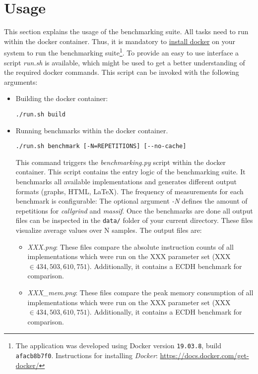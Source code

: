 \section{Usage}\label{sec:benchmarks_usage}
This section explains the usage of the benchmarking suite. All tasks need to run within the docker container. Thus, it is mandatory to \href{https://docs.docker.com/get-docker/}{install docker} on your system to run the benchmarking suite\footnote{The application was developed using Docker version \texttt{19.03.8}, build \texttt{afacb8b7f0}. Instructions for installing \textit{Docker}: \url{https://docs.docker.com/get-docker/}}. To provide an easy to use interface a script \textit{run.sh} is available, which might be used to get a better understanding of the required docker commands. This script can be invoked with the following arguments:
\begin{itemize}
\itemsep0em 
\item Building the docker container:
\begin{lstlisting}[numbers=none,linewidth=4cm]
./run.sh build
\end{lstlisting}


\item Running benchmarks within the docker container.
\begin{lstlisting}[numbers=none,linewidth=10cm]
./run.sh benchmark [-N=REPETITIONS] [--no-cache]
\end{lstlisting}
This command triggers the \textit{benchmarking.py} script within the docker container. This script contains the entry logic of the benchmarking suite. It benchmarks all available implementations and generates different output formats (graphs, \gls{HTML}, LaTeX). The frequency of measurements for each benchmark is configurable: The optional argument \textit{-N}  defines the amount of repetitions for \textit{callgrind} and \textit{massif}. Once the benchmarks are done all output files can be inspected in the  \texttt{data/} folder of your current directory. These files visualize average values over N samples. The output files are:
	\begin{itemize}
	\item \textit{XXX.png}: These files compare the absolute instruction counts of all implementations which were run on the XXX parameter set (XXX $\in {434, 503, 610, 751}$). Additionally, it contains a \gls{ECDH} benchmark for comparison.
	\item \textit{XXX\_mem.png}: These files compare the peak memory consumption of all implementations which were run on the XXX parameter set (XXX $\in {434, 503, 610, 751}$). Additionally, it contains a \gls{ECDH} benchmark for comparison.


\end{itemize}
\end{itemize}

